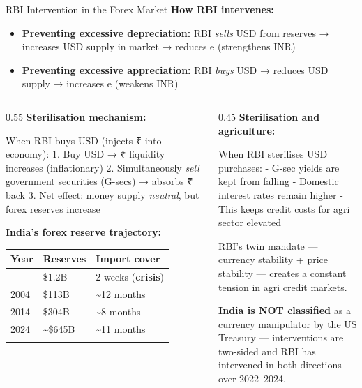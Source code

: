 \documentclass[
  ignorenonframetext,
  aspectratio=169,
]{beamer}
\makeatletter
\providecommand{\tightlist}{%
  \setlength{\itemsep}{0pt}\setlength{\parskip}{0pt}}
\let\quarto@originallabel\label
\DeclareRobustCommand*{\label}[1]{\quarto@originallabel{#1}}
\makeatother
\begin{document}
\begin{frame}{RBI Intervention in the Forex Market}
\label{rbi-intervention-in-the-forex-market}
\textbf{How RBI intervenes:}

\begin{itemize}
\tightlist
\item
  \textbf{Preventing excessive depreciation:} RBI \emph{sells} USD from
  reserves → increases USD supply in market → reduces e (strengthens
  INR)
\item
  \textbf{Preventing excessive appreciation:} RBI \emph{buys} USD →
  reduces USD supply → increases e (weakens INR)
\end{itemize}

\begin{columns}[T]
\begin{column}{0.55\linewidth}
\textbf{Sterilisation mechanism:}

When RBI buys USD (injects ₹ into economy): 1. Buy USD → ₹ liquidity
increases (inflationary) 2. Simultaneously \emph{sell} government
securities (G-secs) → absorbs ₹ back 3. Net effect: money supply
\emph{neutral}, but forex reserves increase

\textbf{India's forex reserve trajectory:}

\begin{longtable}[]{@{}lll@{}}
\toprule\noalign{}
Year & Reserves & Import cover \\
\midrule\noalign{}
\endhead
1991 & \$1.2B & 2 weeks (\textbf{crisis}) \\
2004 & \$113B & \textasciitilde12 months \\
2014 & \$304B & \textasciitilde8 months \\
2024 & \textasciitilde\$645B & \textasciitilde11 months \\
\bottomrule\noalign{}
\end{longtable}
\end{column}

\begin{column}{0.45\linewidth}
\textbf{Sterilisation and agriculture:}

When RBI sterilises USD purchases: - G-sec yields are kept from falling
- Domestic interest rates remain higher - This keeps credit costs for
agri sector elevated

RBI's twin mandate --- currency stability + price stability --- creates
a constant tension in agri credit markets.

\textbf{India is NOT classified} as a currency manipulator by the US
Treasury --- interventions are two-sided and RBI has intervened in both
directions over 2022--2024.
\end{column}
\end{columns}
\end{frame}
\end{document}
